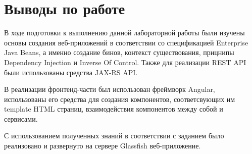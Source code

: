 \documentclass[a4paper, 12pt]{article}
\begin{document}








\section{Выводы по работе}
В ходе подготовки к выполнению данной лабораторной работы были изучены основы создания веб-приложений в соответствии со спецификацией Enterprise Java Beans, 
а именно создание бинов, контекст существования, прицнипы Dependency Injection и Inverse Of Control. Также для реализации REST API были использованы средства JAX-RS API.    

В реализации фронтенд-части был использован фреймворк Angular, использованы его средства для создания компонентов, соответсвующих им template HTML страниц, 
взаимодействия компонентов между собой и сервисами.
 
С использованием полученных знаний в соответствии с заданием было реализовано и развернуто на сервере Glassfish веб-приложение. 
\end{document}
